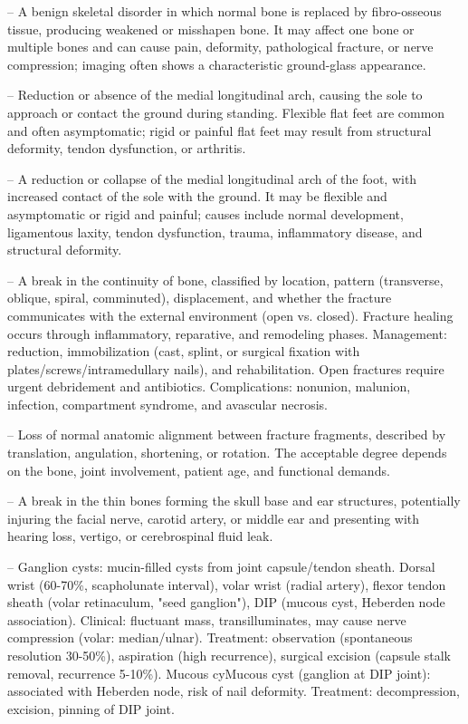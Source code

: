 -- A benign skeletal disorder in which normal bone is replaced by fibro-osseous tissue, producing weakened or misshapen bone. It may affect one bone or multiple bones and can cause pain, deformity, pathological fracture, or nerve compression; imaging often shows a characteristic ground-glass appearance.

-- Reduction or absence of the medial longitudinal arch, causing the sole to approach or contact the ground during standing. Flexible flat feet are common and often asymptomatic; rigid or painful flat feet may result from structural deformity, tendon dysfunction, or arthritis.

-- A reduction or collapse of the medial longitudinal arch of the foot, with increased contact of the sole with the ground. It may be flexible and asymptomatic or rigid and painful; causes include normal development, ligamentous laxity, tendon dysfunction, trauma, inflammatory disease, and structural deformity.

-- A break in the continuity of bone, classified by location, pattern (transverse, oblique, spiral, comminuted), displacement, and whether the fracture communicates with the external environment (open vs. closed). Fracture healing occurs through inflammatory, reparative, and remodeling phases. Management: reduction, immobilization (cast, splint, or surgical fixation with plates/screws/intramedullary nails), and rehabilitation. Open fractures require urgent debridement and antibiotics. Complications: nonunion, malunion, infection, compartment syndrome, and avascular necrosis.

-- Loss of normal anatomic alignment between fracture fragments, described by translation, angulation, shortening, or rotation. The acceptable degree depends on the bone, joint involvement, patient age, and functional demands.

-- A break in the thin bones forming the skull base and ear structures, potentially injuring the facial nerve, carotid artery, or middle ear and presenting with hearing loss, vertigo, or cerebrospinal fluid leak.

-- Ganglion cysts: mucin-filled cysts from joint capsule/tendon sheath. Dorsal wrist (60-70\%, scapholunate interval), volar wrist (radial artery), flexor tendon sheath (volar retinaculum, "seed ganglion"), DIP (mucous cyst, Heberden node association). Clinical: fluctuant mass, transilluminates, may cause nerve compression (volar: median/ulnar). Treatment: observation (spontaneous resolution 30-50\%), aspiration (high recurrence), surgical excision (capsule stalk removal, recurrence 5-10\%). Mucous cyMucous cyst (ganglion at DIP joint): associated with Heberden node, risk of nail deformity. Treatment: decompression, excision, pinning of DIP joint.

